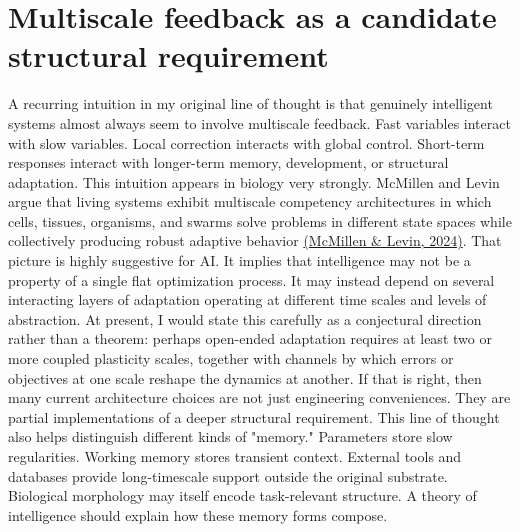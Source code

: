 \documentclass[11pt]{article}
\newcommand{\citejump}[2]{\hyperref[#1]{(#2)}}
\begin{document}
\section{Multiscale feedback as a candidate structural requirement}
A recurring intuition in my original line of thought is that genuinely intelligent systems almost always seem to involve multiscale feedback. Fast variables interact with slow variables. Local correction interacts with global control. Short-term responses interact with longer-term memory, development, or structural adaptation. This intuition appears in biology very strongly. McMillen and Levin argue that living systems exhibit multiscale competency architectures in which cells, tissues, organisms, and swarms solve problems in different state spaces while collectively producing robust adaptive behavior \citejump{ref:mcmillen2024}{McMillen \& Levin, 2024}. That picture is highly suggestive for AI. It implies that intelligence may not be a property of a single flat optimization process. It may instead depend on several interacting layers of adaptation operating at different time scales and levels of abstraction. At present, I would state this carefully as a conjectural direction rather than a theorem: perhaps open-ended adaptation requires at least two or more coupled plasticity scales, together with channels by which errors or objectives at one scale reshape the dynamics at another. If that is right, then many current architecture choices are not just engineering conveniences. They are partial implementations of a deeper structural requirement. This line of thought also helps distinguish different kinds of "memory." Parameters store slow regularities. Working memory stores transient context. External tools and databases provide long-timescale support outside the original substrate. Biological morphology may itself encode task-relevant structure. A theory of intelligence should explain how these memory forms compose.
\end{document}
